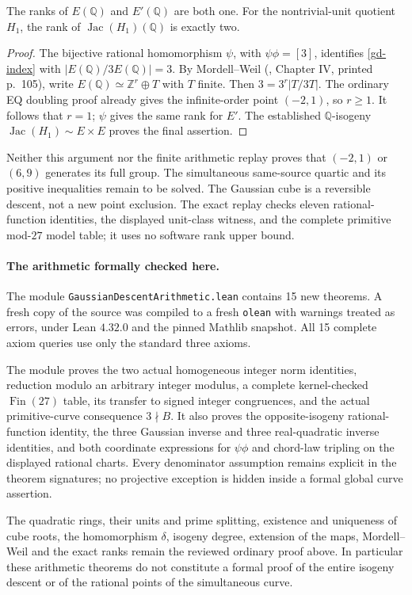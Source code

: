 \begin{corollary}\label{gd-ranks}
The ranks of \(E(\mathbb Q)\) and \(E'(\mathbb Q)\) are both one.
For the nontrivial-unit quotient \(H_1\), the rank of
\(\operatorname{Jac}(H_1)(\mathbb Q)\) is exactly two.
\end{corollary}
\begin{proof}
The bijective rational homomorphism \(\psi\), with \(\psi\phi=[3]\),
identifies \eqref{gd-index} with \(|E(\mathbb Q)/3E(\mathbb Q)|=3\).
By Mordell--Weil (\cite{MilneEC2Descent}, Chapter IV, printed
p.~105), write \(E(\mathbb Q)\simeq\mathbb Z^r\oplus T\) with
\(T\) finite. Then \(3=3^r|T/3T|\). The ordinary EQ doubling proof
already gives the infinite-order point \((-2,1)\), so \(r\geq1\).
It follows that \(r=1\); \(\psi\) gives the same rank for \(E'\).
The established \(\mathbb Q\)-isogeny
\(\operatorname{Jac}(H_1)\sim E\times E\) proves the final assertion.
\end{proof}

Neither this argument nor the finite arithmetic replay proves that
\((-2,1)\) or \((6,9)\) generates its full group. The simultaneous
same-source quartic and its positive inequalities remain to be solved.
The Gaussian cube is a reversible descent, not a new point exclusion.
The exact replay checks eleven rational-function identities, the
displayed unit-class witness, and the complete primitive mod-\(27\)
model table; it uses no software rank upper bound.


\paragraph{The arithmetic formally checked here.}
The module \texttt{GaussianDescent\allowbreak Arithmetic.lean} contains
15 new theorems. A fresh copy of the source was compiled to a fresh
\texttt{olean} with warnings treated as errors, under Lean \(4.32.0\)
and the pinned Mathlib snapshot. All 15 complete axiom queries use
only the standard three axioms.

The module proves the two actual homogeneous integer norm identities,
reduction modulo an arbitrary integer modulus, a complete kernel-checked
\(\operatorname{Fin}(27)\) table, its transfer to signed integer
congruences, and the actual primitive-curve consequence \(3\nmid B\).
It also proves the opposite-isogeny rational-function identity, the
three Gaussian inverse and three real-quadratic inverse identities,
and both coordinate expressions for \(\psi\phi\) and chord-law tripling
on the displayed rational charts. Every denominator assumption remains
explicit in the theorem signatures; no projective exception is hidden
inside a formal global curve assertion.

The quadratic rings, their units and prime splitting, existence and
uniqueness of cube roots, the homomorphism \(\delta\), isogeny degree,
extension of the maps, Mordell--Weil and the exact ranks remain the
reviewed ordinary proof above. In particular these arithmetic theorems
do not constitute a formal proof of the entire isogeny descent or of
the rational points of the simultaneous curve.
